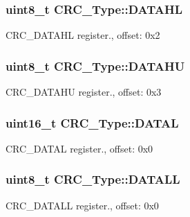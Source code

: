 \subsubsection[{\texorpdfstring{D\+A\+T\+A\+HL}{DATAHL}}]{ uint8\+\_\+t C\+R\+C\+\_\+\+Type\+::\+D\+A\+T\+A\+HL}\hypertarget{structCRC__Type_aa0d3f20454ee094861fe52fdede273ba}{}\label{structCRC__Type_aa0d3f20454ee094861fe52fdede273ba}
C\+R\+C\+\_\+\+D\+A\+T\+A\+HL register., offset\+: 0x2 
\subsubsection[{\texorpdfstring{D\+A\+T\+A\+HU}{DATAHU}}]{ uint8\+\_\+t C\+R\+C\+\_\+\+Type\+::\+D\+A\+T\+A\+HU}\hypertarget{structCRC__Type_ac33c3631edd817832e77cd4a3553ddb3}{}\label{structCRC__Type_ac33c3631edd817832e77cd4a3553ddb3}
C\+R\+C\+\_\+\+D\+A\+T\+A\+HU register., offset\+: 0x3 
\subsubsection[{\texorpdfstring{D\+A\+T\+AL}{DATAL}}]{ uint16\+\_\+t C\+R\+C\+\_\+\+Type\+::\+D\+A\+T\+AL}\hypertarget{structCRC__Type_a1fa95f968c3054004e3c13e5bdcdd352}{}\label{structCRC__Type_a1fa95f968c3054004e3c13e5bdcdd352}
C\+R\+C\+\_\+\+D\+A\+T\+AL register., offset\+: 0x0 
\subsubsection[{\texorpdfstring{D\+A\+T\+A\+LL}{DATALL}}]{ uint8\+\_\+t C\+R\+C\+\_\+\+Type\+::\+D\+A\+T\+A\+LL}\hypertarget{structCRC__Type_abe8d9a7ce8dfc23656f519ae0fe3b88b}{}\label{structCRC__Type_abe8d9a7ce8dfc23656f519ae0fe3b88b}
C\+R\+C\+\_\+\+D\+A\+T\+A\+LL register., offset\+: 0x0 
